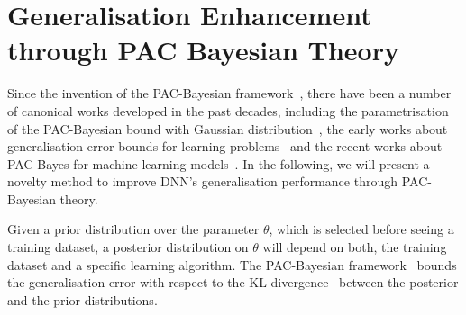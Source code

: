 \section{Generalisation Enhancement through PAC Bayesian Theory}\label{chap:generalisationPAC}


Since the invention of the PAC-Bayesian framework~\cite{mcallester1999pac}, there have been a number of canonical works developed in the past decades, including the parametrisation of the PAC-Bayesian bound with Gaussian distribution~\cite{langford2002not,langford2003pac}, the early works about generalisation error bounds for learning problems~\cite{germain2009pac,maurer2004note,parrado2012pac,welling2011bayesian} and the recent works about PAC-Bayes for machine learning models~\cite{alquier2016properties,blundell2015weight,dwork2015generalization,dwork2015preserving,dziugaite2018data,letarte2019dichotomize,perez2021tighter,rivasplata2019pac,thiemann2017strongly}. In the following, we will present a novelty method to improve DNN's generalisation performance through PAC-Bayesian theory.   


Given a prior distribution over the parameter $\theta$, which is selected before seeing a training dataset, a posterior distribution on $\theta$ will depend on both, the training dataset and a specific learning algorithm. The PAC-Bayesian framework~\cite{mcallester1999pac} bounds the generalisation error with respect to the KL divergence~\cite{KL1951} between the posterior and the prior distributions.


